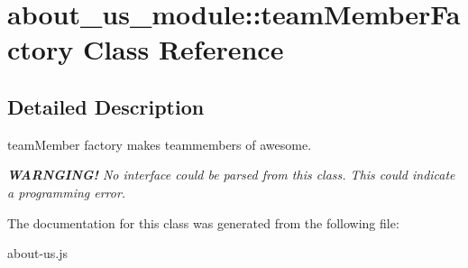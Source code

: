 \hypertarget{classabout__us__module_1_1teamMemberFactory}{\section{about\-\_\-us\-\_\-module\-:\-:team\-Member\-Factory Class Reference}
\label{classabout__us__module_1_1teamMemberFactory}
}


\subsection{Detailed Description}
team\-Member factory makes teammembers of awesome.

{\itshape {\bfseries W\-A\-R\-N\-G\-I\-N\-G!} No interface could be parsed from this class. This could indicate a programming error. } 

The documentation for this class was generated from the following file\-:\begin{DoxyCompactItemize}
\item 
about-\/us.\-js\end{DoxyCompactItemize}
